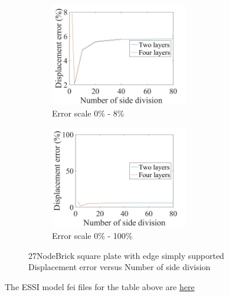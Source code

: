 \documentclass[fleqn,11pt,letter]{article}
\begin{document}
\begin{figure}[H]
  \begin{subfigure}{0.5\textwidth}
    \centering
    \includegraphics[width=6cm]{../Figure_files/27NodeBrick/error27brick_square_plate_simply_supported.jpeg}
    \caption{Error scale 0\% - 8\%}
  \end{subfigure}
  \begin{subfigure}{0.5\textwidth}
    \centering
    \includegraphics[width=6cm]{../Figure_files/27NodeBrick/error27brick_square_plate_simply_supported100.jpeg}
    \caption{Error scale 0\% - 100\%}
  \end{subfigure}
  \captionsetup{justification=centering,margin=3cm}
  \caption{27NodeBrick square plate with edge simply supported\\
      Displacement error   versus   Number of side division}
  \label{fig 27NodeBrick square plate with four edge simply supported}
\end{figure}





The ESSI model fei files for the table above are \href{https://github.com/yuan-energy/ESSI_Verification/blob/master/27NodeBrick/square_plate_simply_support/square_plate_simply_support.tar.gz?raw=true}{here}
\end{document}
